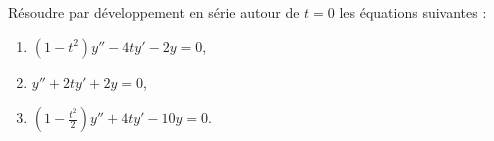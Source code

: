 
\begin{exercice}\label{exo_II-1-24}

Résoudre par développement en série autour de $t=0$ les équations suivantes :
\begin{enumerate}
\item $(1-t^2)y''-4ty'-2y=0$,
\item $y''+2ty'+2y=0$,
\item $(1-\frac{ t^2 }{ 2 })y''+4ty'-10y=0$.
\end{enumerate}

\end{exercice}
